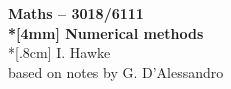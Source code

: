 \documentclass[11pt]{report}
\begin{document}
\thispagestyle{empty}

\begin{titlepage}

  \begin{center}
    {\huge \bf Maths -- 3018/6111 \\*[4mm]
     Numerical methods} \\*[.8cm]
     \large I. Hawke \\
     based on notes by
     \large G. D'Alessandro
  \end{center}

\end{titlepage}

\mbox{}
\thispagestyle{empty}
\newpage

\tableofcontents













\appendix

\end{document}
